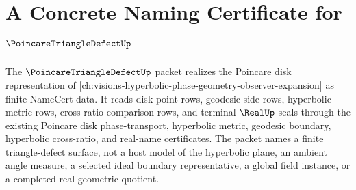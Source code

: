 \chapter{A Concrete Naming Certificate for $\PoincareTriangleDefectUp$}
\label{ch:concrete-instances-poincare-triangle-defect-namecert}

The $\PoincareTriangleDefectUp$ packet realizes the Poincare disk representation of \autoref{ch:visions-hyperbolic-phase-geometry-observer-expansion} as finite NameCert data. It reads disk-point rows, geodesic-side rows, hyperbolic metric rows, cross-ratio comparison rows, and terminal $\RealUp$ seals through the existing Poincare disk phase-transport, hyperbolic metric, geodesic boundary, hyperbolic cross-ratio, and real-name certificates. The packet names a finite triangle-defect surface, not a host model of the hyperbolic plane, an ambient angle measure, a selected ideal boundary representative, a global field instance, or a completed real-geometric quotient.

